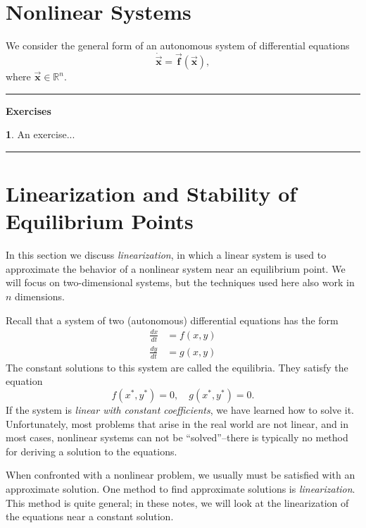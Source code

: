 \documentclass[reqno]{immbook}
\newcommand{\Real}{\mathbb{R}}
\newcommand{\BF}{\vec{\textbf{f}}}
\newcommand{\BX}{\vec{\textbf{x}}}
\numberwithin{equation}{chapter}
\numberwithin{question}{section}
\numberwithin{theorem}{chapter}
\numberwithin{figure}{chapter}
\theoremstyle{definition}
\newtheorem{exercise}{}[section]
\newenvironment{exercises}%
{%
\medskip\hrule\medskip\noindent\textbf{Exercises}%
}%
{%
\medskip\hrule
}
\begin{document}
\section{Nonlinear Systems}
We consider the general form of an autonomous
system of differential equations
\begin{equation}
   \dot{\BX} = \BF\left(\BX\right),
   \label{eqn:NONLIN}
\end{equation}
where $\BX \in \Real^{n}$.

\begin{exercises}
\begin{exercise}
An exercise...
\end{exercise}
\end{exercises}

\newpage

\section{Linearization and Stability of Equilibrium Points}
\label{sec:DELinearization}

In this section we discuss \emph{linearization},
in which a linear system
is used to approximate the behavior of a nonlinear system
near an equilibrium point.
We will focus on two-dimensional systems, but the
techniques used here also work in $n$ dimensions.

Recall that a system of two (autonomous) differential equations has the form
\begin{equation}
\begin{split}
  \frac{dx}{dt} & = f(x,y) \\
  \frac{dy}{dt} & = g(x,y)
\end{split}
\label{eqn:de}
\end{equation}
The constant solutions to this system are called the equilibria.
They satisfy the equation
\begin{equation}
    f(x^*,y^*) = 0, \quad g(x^*,y^*) = 0.
\end{equation}
If the system is \emph{linear with constant
coefficients}, we have learned
how to solve it.  Unfortunately, most problems that arise in the
real world are not linear,
and in most cases, nonlinear systems can not be ``solved''--there is
typically no method for deriving a solution to the equations.

When confronted with a nonlinear problem, we usually must
be satisfied with an approximate solution.
One method to find approximate solutions is \emph{linearization}.
This method is quite general; in these notes, we will look at the
linearization of the equations near a constant solution.
\end{document}
